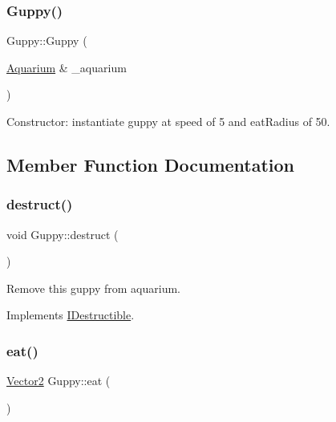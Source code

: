 \subsubsection{\texorpdfstring{Guppy()}{Guppy()}}
{\footnotesize\ttfamily Guppy\+::\+Guppy (\begin{DoxyParamCaption}\item[{\mbox{\hyperlink{class_aquarium}{Aquarium}} \&}]{\+\_\+aquarium }\end{DoxyParamCaption})}



Constructor\+: instantiate guppy at speed of 5 and eat\+Radius of 50. 



\subsection{Member Function Documentation}
\mbox{\label{class_guppy_a26bc11223497fef2ae795283a5682407}} 
\subsubsection{\texorpdfstring{destruct()}{destruct()}}
{\footnotesize\ttfamily void Guppy\+::destruct (\begin{DoxyParamCaption}{ }\end{DoxyParamCaption})\hspace{0.3cm}{\ttfamily [virtual]}}



Remove this guppy from aquarium. 



Implements \mbox{\hyperlink{class_i_destructible_a63016d1bb4daa0a726fc8add9a0be62d}{I\+Destructible}}.

\mbox{\label{class_guppy_aaeab888b423fd0ea3cc911b974b04f48}} 
\subsubsection{\texorpdfstring{eat()}{eat()}}
{\footnotesize\ttfamily \mbox{\hyperlink{struct_vector2}{Vector2}} Guppy\+::eat (\begin{DoxyParamCaption}{ }\end{DoxyParamCaption})\hspace{0.3cm}{\ttfamily [virtual]}}



